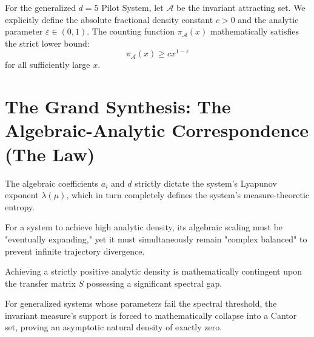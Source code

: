 \begin{theorem}
\leanok
For the generalized $d=5$ Pilot System, let $\mathcal{A}$ be the invariant attracting set. We explicitly define the absolute fractional density constant $c > 0$ and the analytic parameter $\varepsilon \in (0, 1)$. The counting function $\pi_{\mathcal{A}}(x)$ mathematically satisfies the strict lower bound:
$$\pi_{\mathcal{A}}(x) \geq c x^{1-\varepsilon}$$
for all sufficiently large $x$.
\end{theorem}

\chapter{The Grand Synthesis: The Algebraic-Analytic Correspondence (The Law)}

\begin{lemma}
\leanok
\label{thm:lyapunov_scaling_duality}
The algebraic coefficients $a_i$ and $d$ strictly dictate the system's Lyapunov exponent $\lambda(\mu)$, which in turn completely defines the system's measure-theoretic entropy.
\end{lemma}

\begin{theorem}
\leanok
\label{thm:complex_balancing}
For a system to achieve high analytic density, its algebraic scaling must be "eventually expanding," yet it must simultaneously remain "complex balanced" to prevent infinite trajectory divergence.
\end{theorem}

\begin{lemma}
\leanok
Achieving a strictly positive analytic density is mathematically contingent upon the transfer matrix $S$ possessing a significant spectral gap.
\end{lemma}

\begin{theorem}
\leanok
For generalized systems whose parameters fail the spectral threshold, the invariant measure's support is forced to mathematically collapse into a Cantor set, proving an asymptotic natural density of exactly zero.
\end{theorem}


